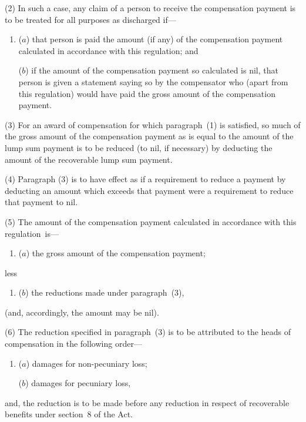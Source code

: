 \documentclass[12pt,a4paper]{article}
\begin{document}
(2) In such a case, any claim of a person to receive the compensation payment is to be treated for all purposes as discharged if—
\begin{enumerate}\item[]
($a$) that person is paid the amount (if any) of the compensation payment calculated in accordance with this regulation; and

($b$) if the amount of the compensation payment so calculated is nil, that person is given a statement saying so by the compensator who (apart from this regulation) would have paid the gross amount of the compensation payment.
\end{enumerate}

(3) For an award of compensation for which paragraph~(1) is satisfied, so much of the gross amount of the compensation payment as is equal to the amount of the lump sum payment is to be reduced (to nil, if necessary) by deducting the amount of the recoverable lump sum payment.

(4) Paragraph (3) is to have effect as if a requirement to reduce a payment by deducting an amount which exceeds that payment were a requirement to reduce that payment to nil.

(5) The amount of the compensation payment calculated in accordance with this regulation~is—
\begin{enumerate}\item[]
($a$) the gross amount of the compensation payment;
\end{enumerate}
less
\begin{enumerate}\item[]
($b$) the reductions made under paragraph~(3),
\end{enumerate}
(and, accordingly, the amount may be nil).

(6) The reduction specified in paragraph~(3) is to be attributed to the heads of compensation in the following order—
\begin{enumerate}\item[]
($a$) damages for non-pecuniary loss;

($b$) damages for pecuniary loss,
\end{enumerate}
and, the reduction is to be made before any reduction in respect of recoverable benefits under section~8 of the Act.
\end{document}
